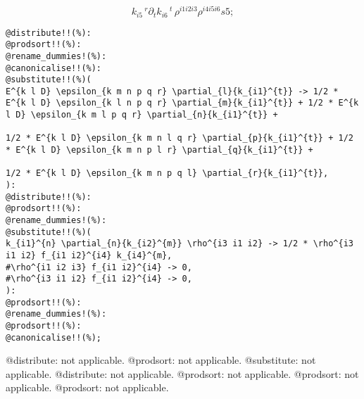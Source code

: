 \documentclass[11pt]{article}
\begin{document}
\begin{dmath*}[compact, spread=2pt]
{k}_{i5}\,^{r} {\partial}_{t}{{k}_{i6}\,^{t}}\,  {\rho}^{i1 i2 i3} {\rho}^{i4 i5 i6} s5;
\end{dmath*}
{\color[named]{Blue}\begin{verbatim}
@distribute!!(%):
@prodsort!!(%):
@rename_dummies!(%):
@canonicalise!!(%):
@substitute!!(%)(
E^{k l D} \epsilon_{k m n p q r} \partial_{l}{k_{i1}^{t}} -> 1/2 * E^{k l D} \epsilon_{k l n p q r} \partial_{m}{k_{i1}^{t}} + 1/2 * E^{k l D} \epsilon_{k m l p q r} \partial_{n}{k_{i1}^{t}} + 
                                                                               1/2 * E^{k l D} \epsilon_{k m n l q r} \partial_{p}{k_{i1}^{t}} + 1/2 * E^{k l D} \epsilon_{k m n p l r} \partial_{q}{k_{i1}^{t}} +
                                                                               1/2 * E^{k l D} \epsilon_{k m n p q l} \partial_{r}{k_{i1}^{t}},
):
@distribute!!(%):
@prodsort!!(%):
@rename_dummies!(%):
@substitute!!(%)(
k_{i1}^{n} \partial_{n}{k_{i2}^{m}} \rho^{i3 i1 i2} -> 1/2 * \rho^{i3 i1 i2} f_{i1 i2}^{i4} k_{i4}^{m},
#\rho^{i1 i2 i3} f_{i1 i2}^{i4} -> 0,
#\rho^{i3 i1 i2} f_{i1 i2}^{i4} -> 0,
):
@prodsort!!(%):
@rename_dummies!(%):
@prodsort!!(%):
@canonicalise!!(%);
\end{verbatim}}
@distribute: not applicable.
@prodsort: not applicable.
@substitute: not applicable.
@distribute: not applicable.
@prodsort: not applicable.
@prodsort: not applicable.
@prodsort: not applicable.
\end{document}
